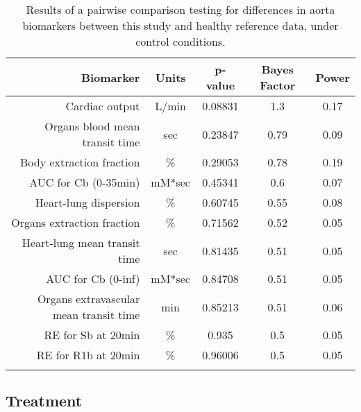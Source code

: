 \documentclass{epflreport}%
\begin{document}
\begin{longtable}{rcccc}%
\hline%
Biomarker&Units&p{-}value&Bayes Factor&Power\\%
\hline%
Cardiac output&L/min&0.08831&1.3&0.17\\%
Organs blood mean transit time&sec&0.23847&0.79&0.09\\%
Body extraction fraction&\%&0.29053&0.78&0.19\\%
AUC for Cb (0{-}35min)&mM*sec&0.45341&0.6&0.07\\%
Heart{-}lung dispersion&\%&0.60745&0.55&0.08\\%
Organs extraction fraction&\%&0.71562&0.52&0.05\\%
Heart{-}lung mean transit time&sec&0.81435&0.51&0.05\\%
AUC for Cb (0{-}inf)&mM*sec&0.84708&0.51&0.05\\%
Organs extravascular mean transit time&min&0.85213&0.51&0.06\\%
RE for Sb at 20min&\%&0.935&0.5&0.05\\%
RE for R1b at 20min&\%&0.96006&0.5&0.05\\%
\hline%
\caption{Results of a pairwise comparison testing for differences in aorta biomarkers between this study and healthy reference data, under control conditions.} \\%
\end{longtable}%
\clearpage%
\subsection{Treatment}%
\label{subsec:Treatment}%
\end{document}
